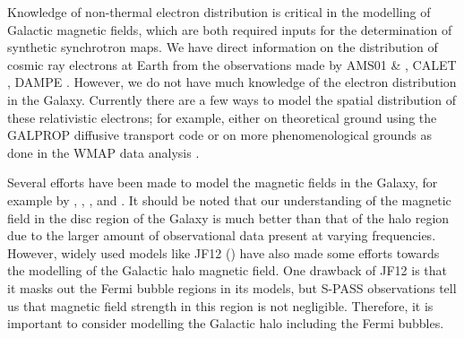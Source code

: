 \documentclass[usenatbib]{mnras}
\newcommand{\Arjen}[1]{{\color{brown}#1}}
\newcommand{\Vasu}[1]{{\color{purple}#1}}
\begin{document}
Knowledge of non-thermal electron distribution is critical in the modelling of Galactic magnetic fields, which are both required inputs for the determination of synthetic synchrotron maps.
We have direct information on the distribution of cosmic ray electrons at Earth from the observations made by AMS01 \cite{AMS_2002} \& \cite{AMS_2014}, CALET \cite{Calet_2017}, DAMPE \cite{Dampe_2017}. However, we do not have much knowledge of the electron distribution in the Galaxy.
Currently there are a few ways to model the spatial distribution of these relativistic electrons; for example, either on theoretical ground using the GALPROP diffusive transport code \cite{Hammurabi} \cite{Orlando_2011} or on more phenomenological grounds as done in the WMAP data analysis \cite{WMAP_Page}.


Several efforts have been made to model the magnetic fields in the Galaxy, for example by \cite{Jaffe_2010}, \cite{Jaffe_2011}, \cite{Sun_2008}, and \cite{JF12}. It should be noted that our understanding of the magnetic field in the disc region of the Galaxy is much better than that of the halo region due to the larger amount of observational data present at varying frequencies. However, widely used models like JF12 (\cite{JF12}) have also made some efforts towards the modelling of the Galactic halo magnetic field. One drawback of JF12 is that it masks out the Fermi bubble regions in its models, but S-PASS \cite{Carretti_2013} observations tell us that magnetic field strength in this region is not negligible. Therefore, it is important to consider modelling the Galactic halo including the Fermi bubbles.

\end{document}
